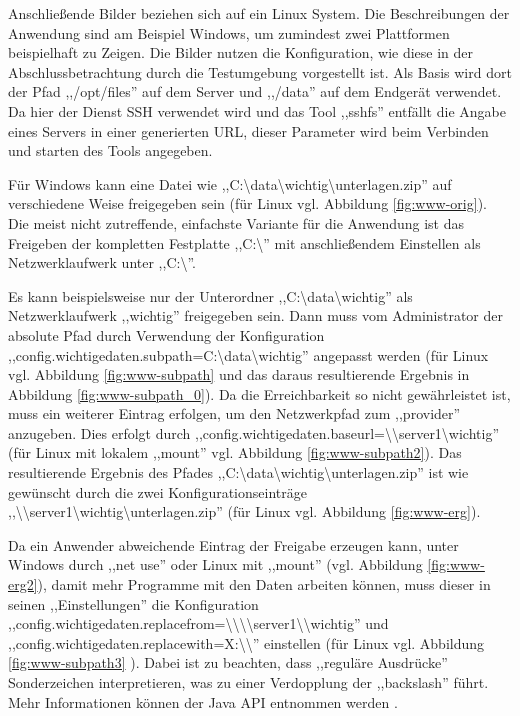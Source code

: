 \documentclass[oneside, ngerman, toc=bibliography,bibliography=totoc,listof=entryprefix, open=right,numbers=noenddot,fontsize=12pt]{scrbook}
\begin{document}
Anschließende Bilder beziehen sich auf ein Linux System. Die Beschreibungen der Anwendung sind am Beispiel Windows, um zumindest zwei Plattformen beispielhaft zu Zeigen.
Die Bilder nutzen die Konfiguration, wie diese in der Abschlussbetrachtung durch die Testumgebung vorgestellt ist. Als Basis wird dort der Pfad ,,/opt/files'' auf dem Server und ,,/data'' auf dem Endgerät verwendet.
Da hier der Dienst SSH verwendet wird und das Tool ,,sshfs'' entfällt die Angabe eines Servers in einer generierten URL, dieser Parameter wird beim Verbinden und starten des Tools angegeben.


Für Windows kann eine Datei wie ,,C:\textbackslash{}data\textbackslash{}wichtig\textbackslash{}unterlagen.zip'' auf verschiedene Weise freigegeben sein (für Linux vgl. Abbildung \ref{fig:www-orig}).
Die meist nicht zutreffende, einfachste Variante für die Anwendung ist das Freigeben der kompletten Festplatte ,,C:\textbackslash{}'' mit anschließendem Einstellen als Netzwerklaufwerk unter ,,C:\textbackslash{}''.


Es kann beispielsweise nur der Unterordner ,,C:\textbackslash{}data\textbackslash{}wichtig'' als Netzwerklaufwerk ,,wichtig'' freigegeben sein. Dann muss vom Administrator der absolute Pfad durch Verwendung der Konfiguration ,,config.wichtigedaten.subpath=C:\textbackslash{}data\textbackslash{}wichtig'' angepasst werden (für Linux vgl. Abbildung \ref{fig:www-subpath} und das daraus resultierende Ergebnis in Abbildung \ref{fig:www-subpath_0}). Da die Erreichbarkeit so nicht gewährleistet ist, muss ein weiterer Eintrag erfolgen, um den Netzwerkpfad zum ,,provider'' anzugeben. Dies erfolgt durch ,,config.wichtigedaten.baseurl=\textbackslash{}\textbackslash{}server1\textbackslash{}wichtig'' (für Linux mit lokalem ,,mount'' vgl. Abbildung  \ref{fig:www-subpath2}). Das resultierende Ergebnis des Pfades ,,C:\textbackslash{}data\textbackslash{}wichtig\textbackslash{}unterlagen.zip'' ist wie gewünscht durch die zwei Konfigurationseinträge  ,,\textbackslash{}\textbackslash{}server1\textbackslash{}wichtig\textbackslash{}unterlagen.zip'' (für Linux vgl. Abbildung \ref{fig:www-erg}).

Da ein Anwender abweichende Eintrag der Freigabe erzeugen kann, unter Windows durch ,,net use'' oder Linux mit ,,mount'' (vgl. Abbildung \ref{fig:www-erg2}),  damit mehr Programme mit den Daten arbeiten können, muss dieser in seinen ,,Einstellungen'' die Konfiguration ,,config.wichtigedaten.replacefrom=\textbackslash{}\textbackslash{}\textbackslash{}\textbackslash{}server1\textbackslash{}\textbackslash{}wichtig'' und ,,config.wichtigedaten.replacewith=X:\textbackslash{}\textbackslash{}'' einstellen  (für Linux vgl. Abbildung \ref{fig:www-subpath3} ). Dabei ist zu beachten, dass ,,reguläre Ausdrücke'' Sonderzeichen interpretieren, was zu einer Verdopplung der ,,backslash'' führt. Mehr Informationen können der Java API entnommen werden  \cite{javaregex}.
\end{document}
